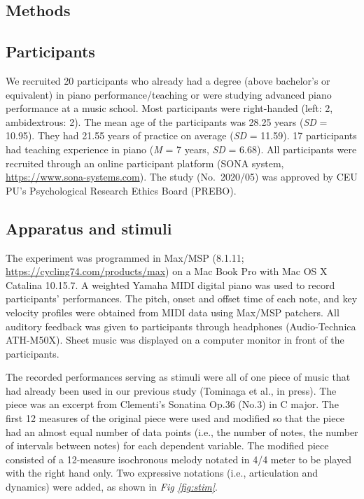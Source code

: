 \documentclass[
  man,floatsintext]{apa6}
\begin{document}
\hypertarget{methods}{%
\subsection{Methods}\label{methods}}

\hypertarget{participants}{%
\subsection{Participants}\label{participants}}

We recruited 20 participants who already had a degree (above bachelor's or equivalent) in piano performance/teaching or were studying advanced piano performance at a music school. Most participants were right-handed (left: 2, ambidextrous: 2). The mean age of the participants was 28.25 years (\emph{SD} = 10.95). They had 21.55 years of practice on average (\emph{SD} = 11.59). 17 participants had teaching experience in piano (\emph{M} = 7 years, \emph{SD} = 6.68). All participants were recruited through an online participant platform (SONA system, \url{https://www.sona-systems.com}). The study (No.~2020/05) was approved by CEU PU's Psychological Research Ethics Board (PREBO).

\hypertarget{apparatus-and-stimuli}{%
\subsection{Apparatus and stimuli}\label{apparatus-and-stimuli}}

The experiment was programmed in Max/MSP (8.1.11; \url{https://cycling74.com/products/max}) on a Mac Book Pro with Mac OS X Catalina 10.15.7. A weighted Yamaha MIDI digital piano was used to record participants' performances. The pitch, onset and offset time of each note, and key velocity profiles were obtained from MIDI data using Max/MSP patchers. All auditory feedback was given to participants through headphones (Audio-Technica ATH-M50X). Sheet music was displayed on a computer monitor in front of the participants.

The recorded performances serving as stimuli were all of one piece of music that had already been used in our previous study (Tominaga et al., in press). The piece was an excerpt from Clementi's Sonatina Op.36 (No.3) in C major. The first 12 measures of the original piece were used and modified so that the piece had an almost equal number of data points (i.e., the number of notes, the number of intervals between notes) for each dependent variable. The modified piece consisted of a 12-measure isochronous melody notated in 4/4 meter to be played with the right hand only. Two expressive notations (i.e., articulation and dynamics) were added, as shown in \emph{Fig \ref{fig:stim}}.
\end{document}
